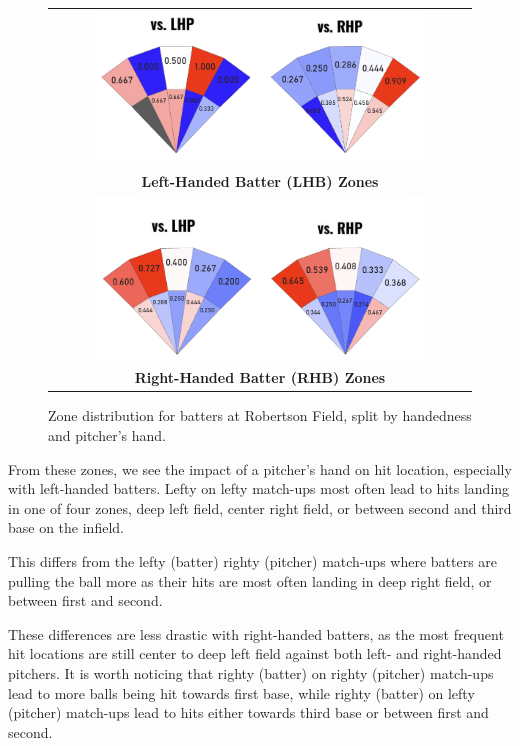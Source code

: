 \documentclass{article}
\begin{document}
\newpage
\begin{figure}[h]
    \centering
    \begin{tabular}{c}  
        \includegraphics[width=0.8\textwidth]{images/LHB2024_zones_Robertson.png} \\
        \textbf{Left-Handed Batter (LHB) Zones} \\[1em]  
        \includegraphics[width=0.8\textwidth]{images/RHB2024_zones__Robertson.png} \\
        \textbf{Right-Handed Batter (RHB) Zones} 
    \end{tabular}
    \caption{Zone distribution for batters at Robertson Field, split by handedness and pitcher’s hand.}
    \label{fig:batting_zones}
    \cite{trackman2024}
\end{figure}
\vspace{.7cm}

From these zones, we see the impact of a pitcher's hand on hit location, especially with left-handed batters. Lefty on lefty match-ups most often lead to hits landing in one of four zones, deep left field, center right field, or between second and third base on the infield. 

This differs from the lefty (batter) righty (pitcher) match-ups where batters are pulling the ball more as their hits are most often landing in deep right field, or between first and second. 

These differences are less drastic with right-handed batters, as the most frequent hit locations are still center to deep left field against both left- and right-handed pitchers. It is worth noticing that righty (batter) on righty (pitcher) match-ups lead to more balls being hit towards first base, while righty (batter) on lefty (pitcher) match-ups lead to hits either towards third base or between first and second. \cite{mlb2023left-handedpitching} \cite{appliedvision2023}
\end{document}
